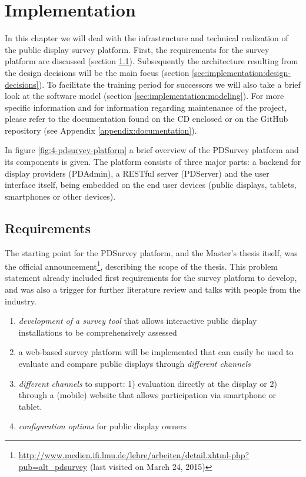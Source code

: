 \section{Implementation}
\label{chapter:implementation}
\label{sec:implementation}

	In this chapter we will deal with the infrastructure and technical realization of the public display survey platform. First, the requirements for the survey platform are discussed (section \ref{sec:implementation:requirements}). Subsequently the architecture resulting from the design decisions will be the main focus (section \ref{sec:implementation:design-decisions}). To facilitate the training period for successors we will also take a brief look at the software model (section \ref{sec:implementation:modeling}). For more specific information and for information regarding maintenance of the project, please refer to the documentation found on the CD enclosed or on the GitHub repository (see Appendix \ref{appendix:documentation}).

	In figure \ref{fig:4-pdsurvey-platform} a brief overview of the PDSurvey platform and its components is given. The platform consists of three major parts: a backend for display providers (PDAdmin), a RESTful server (PDServer) and the user interface itself, being embedded on the end user devices (public displays, tablets, smartphones or other devices). 






\subsection{Requirements}
\label{sec:implementation:requirements}

	The starting point for the PDSurvey platform, and the Master's thesis itself, was the official announcement\footnote{\url{http://www.medien.ifi.lmu.de/lehre/arbeiten/detail.xhtml-php?pub=alt_pdsurvey} (last visited on March 24, 2015)}, describing the scope of the thesis. This problem statement already included first requirements for the survey platform to develop, and was also a trigger for further literature review and talks with people from the industry.

	\begin{enumerate}[itemsep=0pt] 
	\item \textit{development of a survey tool} that allows interactive public display installations to be comprehensively assessed 
	\item a web-based survey platform will be implemented that can easily be used to evaluate and compare public displays through \textit{different channels} 
	\item \textit{different channels} to support: 1) evaluation directly at
	the display or 2) through a (mobile) website that allows participation via smartphone or tablet.
	\item \textit{configuration options} for public display owners
	\end{enumerate}

